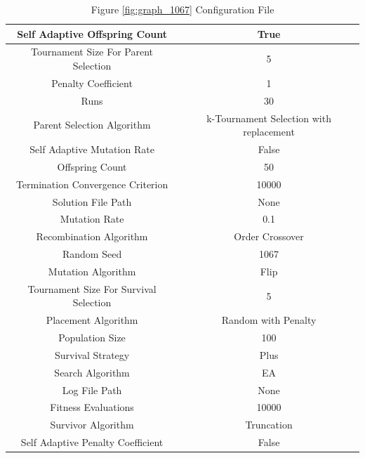 \documentclass{standalone}
\begin{document}
\begin{table}[!htb]
	\centering
	\caption{Figure \ref{fig:graph_1067} Configuration File}
	\label{tab:graph_1067}
	\begin{tabular}{| c | c |}
		\hline
		Self Adaptive Offspring Count		& True		 \\
		\hline
		Tournament Size For Parent Selection		& 5		 \\
		\hline
		Penalty Coefficient		& 1		 \\
		\hline
		Runs		& 30		 \\
		\hline
		Parent Selection Algorithm		& k-Tournament Selection with replacement		 \\
		\hline
		Self Adaptive Mutation Rate		& False		 \\
		\hline
		Offspring Count		& 50		 \\
		\hline
		Termination Convergence Criterion		& 10000		 \\
		\hline
		Solution File Path		& None		 \\
		\hline
		Mutation Rate		& 0.1		 \\
		\hline
		Recombination Algorithm		& Order Crossover		 \\
		\hline
		Random Seed		& 1067		 \\
		\hline
		Mutation Algorithm		& Flip		 \\
		\hline
		Tournament Size For Survival Selection		& 5		 \\
		\hline
		Placement Algorithm		& Random with Penalty		 \\
		\hline
		Population Size		& 100		 \\
		\hline
		Survival Strategy		& Plus		 \\
		\hline
		Search Algorithm		& EA		 \\
		\hline
		Log File Path		& None		 \\
		\hline
		Fitness Evaluations		& 10000		 \\
		\hline
		Survivor Algorithm		& Truncation		 \\
		\hline
		Self Adaptive Penalty Coefficient		& False		 \\
		\hline
	\end{tabular}
\end{table}
\end{document}
